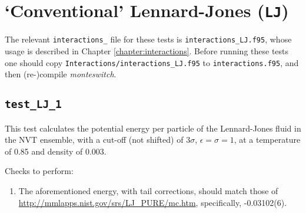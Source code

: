 \documentclass{report}
\begin{document}
\section{`Conventional' Lennard-Jones (\texttt{LJ})}
The relevant \texttt{interactions\_} file for these tests is \texttt{interactions\_LJ.f95}, whose usage is described in Chapter
\ref{chapter:interactions}. Before running these tests one should copy \texttt{Interactions/interactions\_LJ.f95}
to \texttt{interactions.f95}, and then (re-)compile \emph{monteswitch}.


\subsection{\texttt{test\_LJ\_1}}
This test calculates the potential energy per particle of the Lennard-Jones fluid in the NVT ensemble, with a cut-off (not shifted) of
$3\sigma$, $\epsilon=\sigma=1$, at a temperature of 0.85 and density of 0.003.

Checks to perform:
\begin{enumerate}
\item
The aforementioned energy, with tail corrections, should match those of \url{http://mmlapps.nist.gov/srs/LJ_PURE/mc.htm},
specifically, -0.03102(6).
\end{enumerate}





\end{document}
